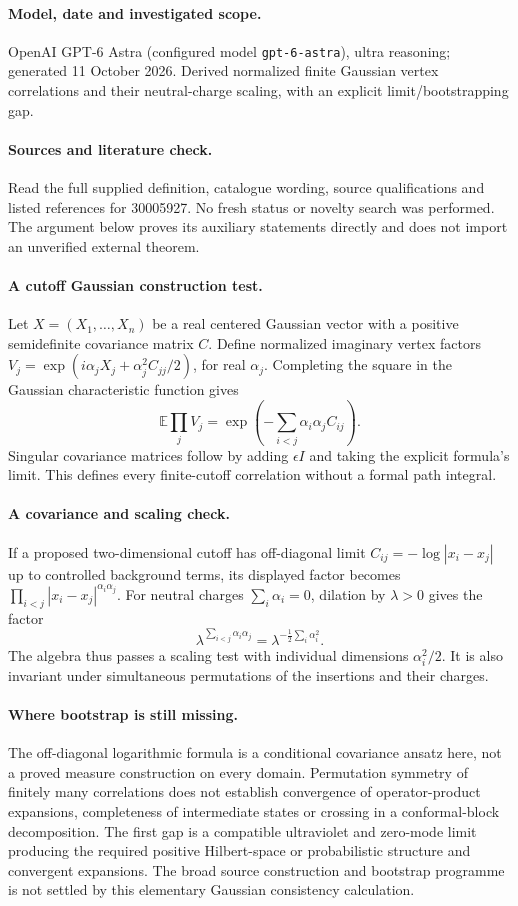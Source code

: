 \documentclass[11pt]{article}
\begin{document}
\paragraph{Model, date and investigated scope.}
OpenAI GPT-6 Astra (configured model \texttt{gpt-6-astra}), ultra reasoning; generated 11 October 2026. Derived normalized finite Gaussian vertex correlations and their neutral-charge scaling, with an explicit limit/bootstrapping gap.

\paragraph{Sources and literature check.}
Read the full supplied definition, catalogue wording, source qualifications and listed references for 30005927. No fresh status or novelty search was performed. The argument below proves its auxiliary statements directly and does not import an unverified external theorem.

\paragraph{A cutoff Gaussian construction test.} Let \(X=(X_1,\ldots,X_n)\) be a real centered Gaussian vector with a positive semidefinite covariance matrix \(C\). Define normalized imaginary vertex factors \(V_j=\exp(i\alpha_jX_j+\alpha_j^2 C_{jj}/2)\), for real \(\alpha_j\). Completing the square in the Gaussian characteristic function gives
\[
 \mathbb E\prod_jV_j
 =\exp\left(-\sum_{i<j}\alpha_i\alpha_j C_{ij}\right).
\]
Singular covariance matrices follow by adding \(\epsilon I\) and taking the explicit formula's limit. This defines every finite-cutoff correlation without a formal path integral.
\paragraph{A covariance and scaling check.} If a proposed two-dimensional cutoff has off-diagonal limit \(C_{ij}=-\log|x_i-x_j|\) up to controlled background terms, its displayed factor becomes \(\prod_{i<j}|x_i-x_j|^{\alpha_i\alpha_j}\). For neutral charges \(\sum_i\alpha_i=0\), dilation by \(\lambda>0\) gives the factor
\[
 \lambda^{\sum_{i<j}\alpha_i\alpha_j}
 =\lambda^{-\frac12\sum_i\alpha_i^2}.
\]
The algebra thus passes a scaling test with individual dimensions \(\alpha_i^2/2\). It is also invariant under simultaneous permutations of the insertions and their charges.
\paragraph{Where bootstrap is still missing.} The off-diagonal logarithmic formula is a conditional covariance ansatz here, not a proved measure construction on every domain. Permutation symmetry of finitely many correlations does not establish convergence of operator-product expansions, completeness of intermediate states or crossing in a conformal-block decomposition. The first gap is a compatible ultraviolet and zero-mode limit producing the required positive Hilbert-space or probabilistic structure and convergent expansions. The broad source construction and bootstrap programme is not settled by this elementary Gaussian consistency calculation.
\end{document}
